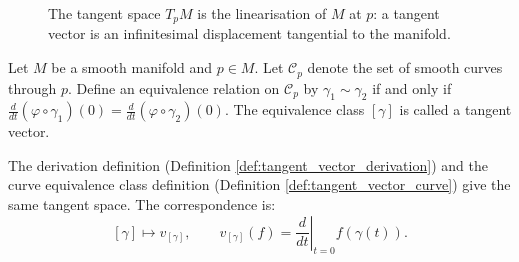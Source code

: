 \begin{figure}[htbp]
\centering
{}
\caption{The tangent space $T_pM$ is the linearisation of $M$ at $p$: a tangent vector is an infinitesimal displacement tangential to the manifold.}
\label{fig:tangent_space}
\end{figure}

\begin{definition}\label{def:tangent_vector_curve}
Let $M$ be a smooth manifold and $p \in M$. Let $\mathcal{C}_p$ denote the set of smooth curves through $p$. Define an equivalence relation on $\mathcal{C}_p$ by $\gamma_1 \sim \gamma_2$ if and only if $\frac{d}{dt}(\varphi \circ \gamma_1)(0) = \frac{d}{dt}(\varphi \circ \gamma_2)(0)$. The equivalence class $[\gamma]$ is called a tangent vector.
\end{definition}

\begin{lemma}\label{lem:tangent_vector_equivalence}
The derivation definition (Definition \ref{def:tangent_vector_derivation}) and the curve equivalence class definition (Definition \ref{def:tangent_vector_curve}) give the same tangent space. The correspondence is:
\[
[\gamma] \mapsto v_{[\gamma]}, \qquad v_{[\gamma]}(f) = \left. \frac{d}{dt} \right|_{t=0} f(\gamma(t)).
\]
\end{lemma}

